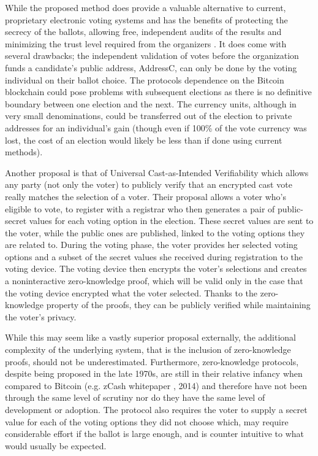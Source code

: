 \documentclass{article}
\begin{document}
While the proposed method does provide a valuable alternative to current, proprietary electronic voting systems and has the benefits of protecting the secrecy of the ballots, allowing free, independent audits of the results and minimizing the trust level required from the organizers \citep{3_noizat_2016}. It does come with several drawbacks; the independent validation of votes before the organization funds a candidate's public address, AddressC, can only be done by the voting individual on their ballot choice. The protocols dependence on the Bitcoin blockchain could pose problems with subsequent elections as there is no definitive boundary between one election and the next. The currency units, although in very small denominations, could be transferred out of the election to private addresses for an individual's gain (though even if 100\% of the vote currency was lost, the cost of an election would likely be less than if done using current methods).

Another proposal is that of Universal Cast-as-Intended Verifiability \citep{49_escala_guasch_herranz_morillo_2015} which allows any party (not only the voter) to publicly verify that an encrypted cast vote really matches the selection of a voter. Their proposal allows a voter who’s eligible to vote, to register with a registrar who then generates a pair of public-secret values for each voting option in the election. These secret values are sent to the voter, while the public ones are published, linked to the voting options they are related to. During the voting phase, the voter provides her selected voting options and a subset of the secret values she received during registration to the voting device. The voting device then encrypts the voter’s selections and creates a noninteractive zero-knowledge proof, which will be valid only in the case that the voting device encrypted what the voter selected. Thanks to the zero-knowledge property of the proofs, they can be publicly verified while maintaining the voter’s privacy.

While this may seem like a vastly superior proposal externally, the additional complexity of the underlying system, that is the inclusion of zero-knowledge proofs, should not be underestimated. Furthermore, zero-knowledge protocols, despite being proposed in the late 1970s, are still in their relative infancy when compared to Bitcoin (e.g. zCash whitepaper \citep{50_ben-sasson_chiesa_garman_green_miers_tromer_virza_2014}, 2014) and therefore have not been through the same level of scrutiny nor do they have the same level of development or adoption. The protocol also requires the voter to supply a secret value for each of the voting options they did not choose which, may require considerable effort if the ballot is large enough, and is counter intuitive to what would usually be expected.

\end{document}
